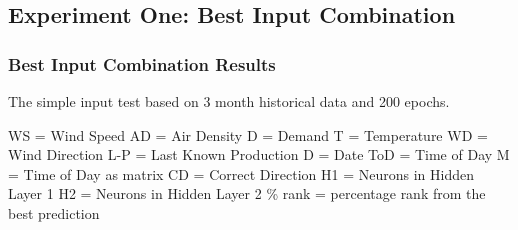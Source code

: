 \subsection{Experiment One: Best Input Combination}

\subsubsection{Best Input Combination Results}
\label{sec:simpleInputTest}
The simple input test based on 3 month historical data and 200 epochs.

WS = Wind Speed
AD = Air Density
D = Demand
T = Temperature
WD = Wind Direction
L-P = Last Known Production
D = Date
ToD = Time of Day
M = Time of Day as matrix
CD = Correct Direction
H1 = Neurons in Hidden Layer 1
H2 = Neurons in Hidden Layer 2
\% rank = percentage rank from the best prediction

